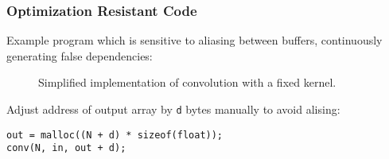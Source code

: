 \documentclass{beamer}
\begin{document}
\begin{frame}
  \frametitle{Optimization Resistant Code}


Example program which is sensitive to aliasing between buffers, continuously generating false dependencies:


\begin{figure}[t]
  
  \caption{Simplified implementation of convolution with a fixed kernel.}
  \label{lst:conv}
\end{figure}


Adjust address of output array by \texttt{d} bytes manually to avoid alising:

\begin{lstlisting}[belowskip=-4pt, basicstyle=\ttfamily\small]
out = malloc((N + d) * sizeof(float));
conv(N, in, out + d);
\end{lstlisting}


\end{frame}
\end{document}
